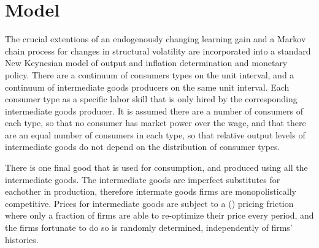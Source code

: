 \documentclass[12pt]{article}
\newcommand{\citee}[1]{\citename{#1} (\citeyear{#1})}
\begin{document}
\section{Model}
The crucial extentions of an endogenously changing learning gain and a Markov chain process for changes in structural volatility are incorporated into a standard New Keynesian model of output and inflation determination and monetary policy.  There are a continuum of consumers types on the unit interval, and a continuum of intermediate goods producers on the same unit interval.  Each consumer type as a specific labor skill that is only hired by the corresponding intermediate goods producer.  It is assumed there are a number of consumers of each type, so that no consumer has market power over the wage, and that there are an equal number of consumers in each type, so that relative output levels of intermediate goods do not depend on the distribution of consumer types.

There is one final good that is used for consumption, and produced using all the intermediate goods.  The intermediate goods are imperfect substitutes for eachother in production, therefore intermate goods firms are monopolistically competitive.  Prices for intermediate goods are subject to a \citee{calvo1983} pricing friction where only a fraction of firms are able to re-optimize their price every period, and the firms fortunate to do so is randomly determined, independently of firms' histories.
\end{document}
